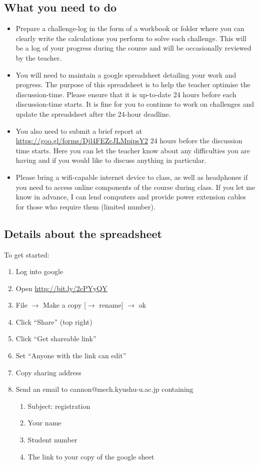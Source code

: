 \subsection{What you need to do}
\begin{itemize}
    \item Prepare a challenge-log in the form of a workbook or folder where you can clearly write the calculations you perform to solve each challenge. This will be a log of your progress during the course and will be occasionally reviewed by the teacher.
    \item You will need to maintain a google spreadsheet detailing your work and progress. The purpose of this spreadsheet is to help the teacher optimise the discussion-time. Please ensure that it is up-to-date 24 hours before each discussion-time starts. It is fine for you to continue to work on challenges and update the spreadsheet after the 24-hour deadline.
    \item You also need to submit a brief report at \url{https://goo.gl/forms/Djl4FEZcJLMpipsY2} 24 hours before the discussion time starts. Here you can let the teacher know about any difficulties you are having and if you would like to discuss anything in particular.
    \item Please bring a wifi-capable internet device to class, as well as headphones if you need to access online components of the course during class. If you let me know in advance, I can lend computers and provide power extension cables for those who require them (limited number).
\end{itemize}

\subsection{Details about the spreadsheet}
To get started:
\begin{enumerate}
    \item Log into google
    \item Open \url{http://bit.ly/2cPYyQY}
    \item File $\rightarrow$ Make a copy [$\rightarrow$ rename] $\rightarrow$ ok
    \item Click ``Share'' (top right)
    \item Click ``Get shareable link''
    \item Set ``Anyone with the link can edit''
    \item Copy sharing address
    \item Send an email to cannon@mech.kyushu-u.ac.jp containing
    \begin{enumerate}
       \item Subject: \course registration
       \item Your name
       \item Student number
       \item The link to your copy of the google sheet
    \end{enumerate}
\end{enumerate}

